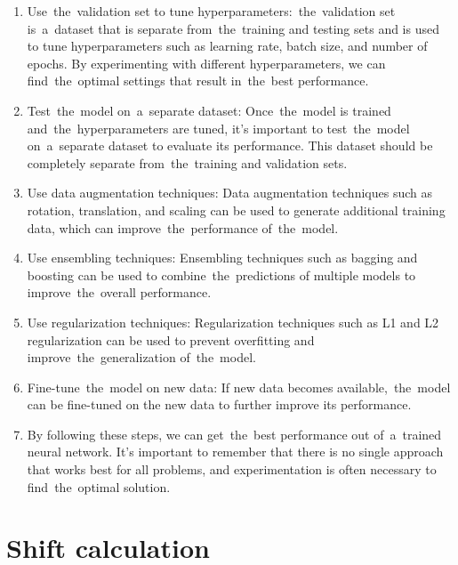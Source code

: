         \begin{enumerate}
            \item Use~the~validation set to tune hyperparameters:~the~validation set is~a~dataset that is separate
            from~the~training and testing sets and is used to tune hyperparameters such as learning rate, batch size,
            and number of epochs. By experimenting with different hyperparameters, we can find~the~optimal settings
            that result in~the~best performance.
            \item Test~the~model on~a~separate dataset: Once~the~model is trained and~the~hyperparameters are tuned,
            it's important to test~the~model on~a~separate dataset to evaluate its performance. This dataset should be
            completely separate from~the~training and validation sets.
            \item Use data augmentation techniques: Data augmentation techniques such as rotation, translation, and
            scaling can be used to generate additional training data, which can improve~the~performance of~the~model.
            \item Use ensembling techniques: Ensembling techniques such as bagging and boosting can be used to
            combine~the~predictions of multiple models to improve~the~overall performance.
            \item Use regularization techniques: Regularization techniques such as L1 and L2 regularization
            can be used to prevent overfitting and improve~the~generalization of~the~model.
            \item Fine-tune~the~model on new data: If new data becomes available,~the~model can be fine-tuned on the
            new data to further improve its performance.
            \item By following these steps, we can get~the~best performance out of~a~trained neural network.
            It's important to remember that there is no single approach that works best for all problems, and
            experimentation is often necessary to find~the~optimal solution.
        \end{enumerate}
    \section{Shift calculation}\label{sec:shiftcalc}
